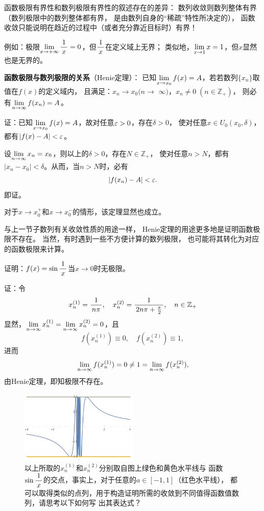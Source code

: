 函数极限有界性和数列极限有界性的叙述存在的差异：
数列收敛则数列整体有界（数列极限中的数列整体都有界，
是由数列自身的“稀疏”特性所决定的），
函数收敛只能说明在趋近的过程中（或者充分靠近目标时）有界！

例如：极限$\lim\limits_{x\to{+\infty}}\displaystyle\frac{\,{1}\,}{\,{x}\,}=0$，但$\displaystyle\frac{\,{1}\,}{\,{x}\,}$在定义域上无界；
类似地，$\lim\limits_{x\to{1}}x=1$，但$x$显然也是无界的。

\bs
\begin{thx}
	{\bf 函数极限与数列极限的关系}（{\kaishu Henie定理}）：
	已知$\lim\limits_{x\to{x_0}}f(x)=A$，若若数列$\{x_n\}$取值在$f(x)$的定义域内，
	且满足：$x_n\to x_0(n\to$ $\infty)$，$x_n\ne 0\;
	(n\in\mathbb{Z}_+)$，
	则必有$\lim\limits_{n\to\infty} f(x_n)=A$。
\end{thx}

证：已知$\lim\limits_{x\to{x_0}}f(x)=A$，故对任意$\varepsilon>0$，存在$\delta>0$，
使对任意$x\in U_0(x_0,\delta)$，都有$|f(x)-A|<\varepsilon$。

设$\lim\limits_{n\to\infty} x_n=x_0$，则以上的$\delta>0$，存在$N\in\mathbb{Z}_+$，
使对任意$n>N$，都有$|x_n-x_0|<\delta$。从而，当$n>N$时，必有
$$|f(x_n)-A|<\varepsilon.$$
即证。\fin

对于$x\to x_0^+$和$x\to x_0^-$的情形，该定理显然也成立。

与上一节子数列有关收敛性质的用途一样，
Henie定理的用途更多地是证明函数极限不存在。
当然，有时遇到一些不方便计算的数列极限，
也可能将其转化为对应的函数极限来计算。

\bs
\egz 证明：$f(x)=\sin\displaystyle\frac{\,{1}\,}{\,{x}\,}$当$x\to 0$时无极限。

证：令
$$x^{(1)}_n=\displaystyle\frac{\,{1}\,}{\,{n\pi}\,},\quad
x^{(2)}_n=\displaystyle\frac{\,{1}\,}{\,{2n\pi+\frac{\pi}2}\,},\quad n\in\mathbb{Z}_+$$ 
显然，$\lim\limits_{n\to\infty} x^{(1)}_n=\lim\limits_{n\to\infty} x^{(2)}_n=0$，且
$$f(x^{(1)}_n)\equiv0,\quad f(x^{(2)}_n)\equiv1,$$
进而
$$\lim\limits_{n\to\infty} f(x^{(1)}_n)=0\ne1=\lim\limits_{n\to\infty} f(x^{(2)}_n),$$
由Henie定理，即知极限不存在。\fin
	
\begin{figure}[h]
	\centering
	\includegraphics[width=0.5\textwidth]{./Images/Ch01/sin1x.pdf}
	\caption{以上所取的$x^{(1)}_n$和$x^{(2)}_n$分别取自图上绿色和黄色水平线与
	函数$\sin\displaystyle\frac{\,{1}\,}{\,{x}\,}$的交点，事实上，对于任意的$a\in[-1,1]$（红色水平线），
	都可以取得类似的点列，用于构造证明所需的收敛到不同值得函数值数列，请思考以下如何写
	出其表达式？}
	\label{fig:sin1x1-1}
\end{figure}

